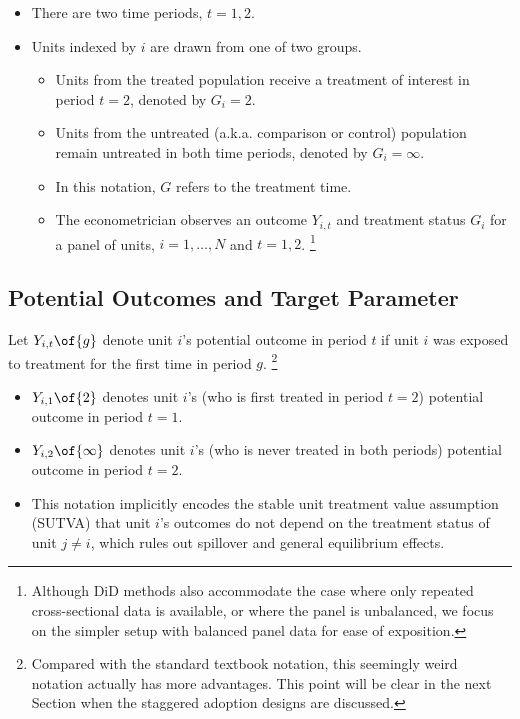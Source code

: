 \documentclass[12pt]{article}
\theoremstyle{definition}
\begin{document}
\begin{itemize}[topsep=0pt, leftmargin=20pt, itemsep=0pt]
\setlength{\parskip}{10pt} 
\item There are two time periods, $t = 1, 2$.
\item Units indexed by $i$ are drawn from one of two groups.
\begin{itemize}[topsep=0pt, leftmargin=26pt, itemsep=0pt]
	\setlength{\parskip}{10pt} 
	\item Units from the treated population receive a treatment of interest in period $t=2$, denoted by $G_i = 2$. 
	\item Units from the untreated (a.k.a. comparison or control) population remain untreated in both time periods, denoted by $G_i = \infty$.
	\item In this notation, $G$ refers to the treatment time.
	\item The econometrician observes an outcome $Y_{i,t}$ and treatment status $G_i$ for a panel of units, $i = 1, \ldots, N$ and $t = 1, 2$. \footnote{Although DiD methods also accommodate the case where only repeated cross-sectional data is available, or where the panel is unbalanced, we focus on the simpler setup with balanced panel data for ease of exposition. }
\end{itemize}
\end{itemize}



\subsection{Potential Outcomes and Target Parameter}

Let $Y_{i,t}\of{g}$ denote unit $i$'s potential outcome in period $t$ if unit $i$ was exposed to treatment for the first time in period $g$. \footnote{Compared with the standard textbook notation, this seemingly weird notation actually has more advantages. This point will be clear in the next Section when the staggered adoption designs are discussed.}

\begin{itemize}[topsep=0pt, leftmargin=20pt, itemsep=0pt]
\setlength{\parskip}{10pt} 
\item $Y_{i, 1}\of{2}$ denotes unit $i$'s (who is first treated in period $t=2$) potential outcome in period $t=1$. 
\item $Y_{i, 2}\of{\infty}$ denotes unit $i$'s (who is never treated in both periods) potential outcome in period $t=2$. 
\item This notation implicitly encodes the stable unit treatment value assumption (SUTVA) that unit $i$'s outcomes do not depend on the treatment status of unit $j \neq i$, which rules out spillover and general equilibrium effects. 
\end{itemize}
\end{document}

